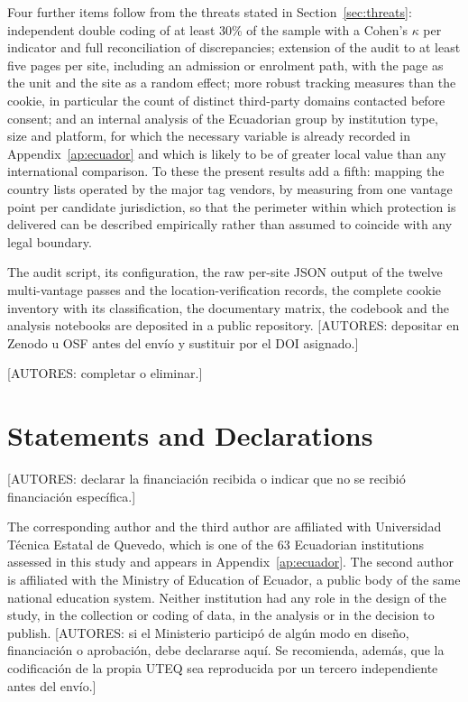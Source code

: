 \documentclass[pdflatex,sn-basic,Numbered]{sn-jnl}
\theoremstyle{thmstyleone}
\theoremstyle{thmstyletwo}
\theoremstyle{thmstylethree}
\begin{document}
Four further items follow from the threats stated in Section~\ref{sec:threats}: independent double coding of at least 30\% of the sample with a Cohen's $\kappa$ per indicator and full reconciliation of discrepancies; extension of the audit to at least five pages per site, including an admission or enrolment path, with the page as the unit and the site as a random effect; more robust tracking measures than the cookie, in particular the count of distinct third-party domains contacted before consent; and an internal analysis of the Ecuadorian group by institution type, size and platform, for which the necessary variable is already recorded in Appendix~\ref{ap:ecuador} and which is likely to be of greater local value than any international comparison. To these the present results add a fifth: mapping the country lists operated by the major tag vendors, by measuring from one vantage point per candidate jurisdiction, so that the perimeter within which protection is delivered can be described empirically rather than assumed to coincide with any legal boundary.

\backmatter

The audit script, its configuration, the raw per-site JSON output of the twelve multi-vantage passes and the location-verification records, the complete cookie inventory with its classification, the documentary matrix, the codebook and the analysis notebooks are deposited in a public repository. \textcolor{gris}{[AUTORES: depositar en Zenodo u OSF antes del env\'io y sustituir por el DOI asignado.]}

\textcolor{gris}{[AUTORES: completar o eliminar.]}

\section*{Statements and Declarations}

\textcolor{gris}{[AUTORES: declarar la financiaci\'on recibida o indicar que no se recibi\'o financiaci\'on espec\'ifica.]}

The corresponding author and the third author are affiliated with Universidad T\'ecnica Estatal de Quevedo, which is one of the 63 Ecuadorian institutions assessed in this study and appears in Appendix~\ref{ap:ecuador}. The second author is affiliated with the Ministry of Education of Ecuador, a public body of the same national education system. Neither institution had any role in the design of the study, in the collection or coding of data, in the analysis or in the decision to publish. \textcolor{gris}{[AUTORES: si el Ministerio particip\'o de alg\'un modo en dise\~no, financiaci\'on o aprobaci\'on, debe declararse aqu\'i. Se recomienda, adem\'as, que la codificaci\'on de la propia UTEQ sea reproducida por un tercero independiente antes del env\'io.]}
\end{document}
